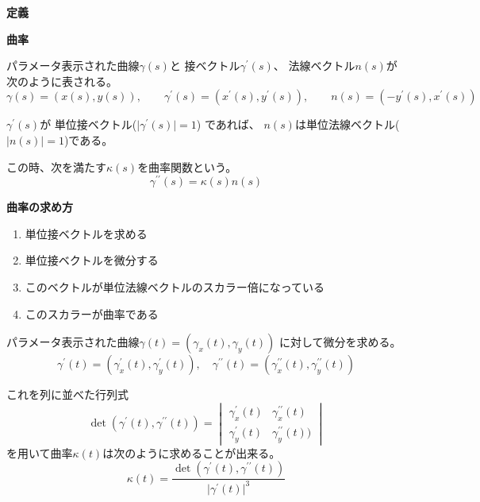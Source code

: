 \documentclass[12pt,b5paper]{ltjsarticle}
\begin{document}
\hrulefill
\textbf{定義}
\hrulefill

\textbf{曲率}

パラメータ表示された曲線$\gamma(s)$と
接ベクトル$\gamma^{\prime}(s)$、
法線ベクトル$n(s)$が次のように表される。
\begin{equation}
 \gamma(s) = (x(s), y(s))
  ,\qquad
 \gamma^{\prime}(s) = (x^{\prime}(s), y^{\prime}(s))
  ,\qquad
 n(s) = (- y^{\prime}(s), x^{\prime}(s))
\end{equation}

$\gamma^{\prime}(s)$が
単位接ベクトル($\lvert \gamma^{\prime}(s)\rvert =1$)
であれば、
$n(s)$は単位法線ベクトル($\lvert n(s) \rvert =1$)である。

この時、次を満たす$\kappa(s)$を曲率関数という。
\begin{equation}
 \gamma^{\prime\prime}(s)=\kappa(s)n(s)
\end{equation}

\textbf{曲率の求め方}

\begin{enumerate}
 \item 単位接ベクトルを求める
 \item 単位接ベクトルを微分する
 \item このベクトルが単位法線ベクトルのスカラー倍になっている
 \item このスカラーが曲率である
\end{enumerate}


パラメータ表示された曲線$\gamma(t)=(\gamma_{x}(t),\gamma_{y}(t))$
に対して微分を求める。
\begin{equation}
 \gamma^{\prime}(t)=(\gamma_{x}^{\prime} (t),\gamma_{y}^{\prime} (t))
  ,\quad
 \gamma^{\prime\prime}(t)=(\gamma_{x}^{\prime\prime} (t),\gamma_{y}^{\prime\prime} (t))
\end{equation}

これを列に並べた行列式
\begin{equation}
 \det(\gamma^{\prime}(t), \gamma^{\prime\prime}(t))
  =
  \begin{vmatrix}
   \gamma_{x}^{\prime} (t) & \gamma_{x}^{\prime\prime} (t)\\
   \gamma_{y}^{\prime} (t) & \gamma_{y}^{\prime\prime} (t))
  \end{vmatrix}
\end{equation}
を用いて曲率$\kappa(t)$は次のように求めることが出来る。
\begin{equation}
 \kappa(t) = \frac{\det(\gamma^{\prime}(t), \gamma^{\prime\prime}(t))}{\lvert \gamma^{\prime}(t) \rvert^3}
\end{equation}
\end{document}
